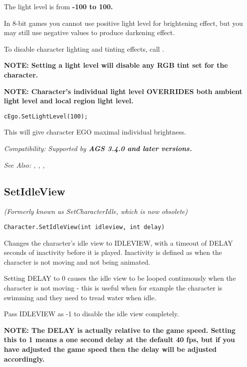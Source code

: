 The light level is from \bf{-100 to 100}.

In 8-bit games you cannot use positive light level for brightening effect, but you
may still use negative values to produce darkening effect.

To disable character lighting and tinting effects, call .

\bf{NOTE}: Setting a light level will disable any RGB tint set for the character.

\bf{NOTE:} Character's individual light level OVERRIDES both ambient light level and local region light level.

\begin{verbatim}
cEgo.SetLightLevel(100);
\end{verbatim}
This will give character EGO maximal individual brightness.

\it{Compatibility:} Supported by \bf{AGS 3.4.0} and later versions.

\it{See Also:} ,
,
,


\subsection{SetIdleView}\label{Character.SetIdleView}%

\it{(Formerly known as SetCharacterIdle, which is now obsolete)}

\begin{verbatim}
Character.SetIdleView(int idleview, int delay)
\end{verbatim}
Changes the character's idle view to IDLEVIEW, with a timeout of DELAY seconds
of inactivity before it is played. Inactivity is defined as when the character
is not moving and not being animated.

Setting DELAY to 0 causes the idle view to be looped continuously when
the character is not moving - this is useful when for example the character
is swimming and they need to tread water when idle.

Pass IDLEVIEW as -1 to disable the idle view completely.

\bf{NOTE:} The DELAY is actually relative to the game speed. Setting this to 1 means
a one second delay at the default 40 fps, but if you have adjusted the game speed then
the delay will be adjusted accordingly.

